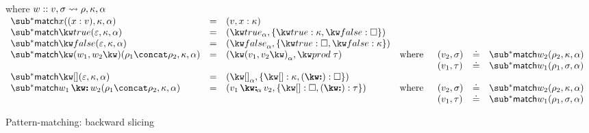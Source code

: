 \begin{figure}[H]
\flushleft {}
 where $w :: v, \sigma \rightsquigarrow \rho, \kappa, \alpha$ \\
 \small
\vspace{3mm}
$\begin{array}{lllll}
   \matchBwdF{\matchVarNew{x}}(\bind{x}{v}, \kappa, \alpha)
   &=&
   (v, \elimVar{x}{\kappa})
   \\
   \matchBwdF{\matchTrueNew}(\seqEmpty, \kappa, \alpha)
   &=&
   (\annTrue{\alpha}, \elimBool{\kappa}{\hole})
   \\
   \matchBwdF{\matchFalseNew}(\seqEmpty, \kappa, \alpha)
   &=&
   (\annFalse{\alpha}, \elimBool{\hole}{\kappa})
   \\
   \matchBwdF{\matchPair{w_1}{w_2}}(\rho_1 \concat \rho_2, \kappa, \alpha)
   &=&
   (\annPair{v_1}{v_2}{\alpha}, \elimProd{\tau})
   &\text{where}&
   \begin{array}[t]{lll}
      (v_2, \sigma) &\eq& \matchBwdF{w_2}(\rho_2, \kappa, \alpha)
      \\
      (v_1, \tau) &\eq& \matchBwdF{w_1}(\rho_1, \sigma, \alpha)
   \end{array}
   \\
   \matchBwdF{\matchNilNew}(\seqEmpty,\kappa,\alpha)
   &=&
   (\annNil{\alpha}, \elimList{\kappa}{\hole})
   \\
   \matchBwdF{\matchConsNew{w_1}{w_2}}(\rho_1 \concat \rho_2, \kappa, \alpha)
   &=&
   (\annCons{v_1}{v_2}{\alpha}, \elimList{\hole}{\tau})
   &\text{where}&
   \begin{array}[t]{lll}
      (v_2, \sigma) &\eq& \matchBwdF{w_2}(\rho_2, \kappa, \alpha)
      \\
      (v_1, \tau) &\eq& \matchBwdF{w_1}(\rho_1, \sigma, \alpha)
   \end{array}
\end{array}$
\caption{Pattern-matching: backward slicing}
\end{figure}
